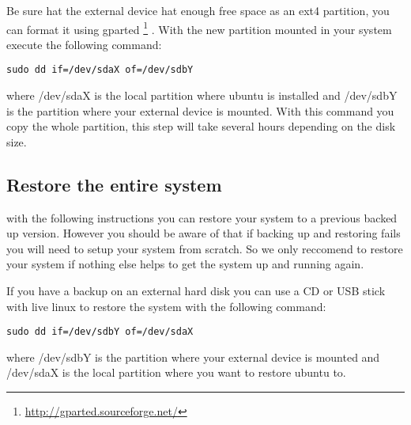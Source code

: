 Be sure hat the external device hat enough free space as an ext4 partition, you can format it using gparted \footnote{\url{http://gparted.sourceforge.net/}} . With the new partition mounted in your system execute the following command:
\begin{lstlisting}
sudo dd if=/dev/sdaX of=/dev/sdbY
\end{lstlisting}
where /dev/sdaX is the local partition where ubuntu is installed and /dev/sdbY is the partition where your external device is mounted. With this command you copy the whole partition, this step will take several hours depending on the disk size.

\subsection{Restore the entire system}
with the following instructions you can restore your system to a previous backed up version. However you should be aware of that if backing up and restoring fails you will need to setup your system from scratch. So we only reccomend to restore your system if nothing else helps to get the system up and running again. 

If you have a backup on an external hard disk you can use a CD or USB stick with live linux to restore the system with the following command:
\begin{lstlisting}
sudo dd if=/dev/sdbY of=/dev/sdaX
\end{lstlisting}
where /dev/sdbY is the partition where your external device is mounted and /dev/sdaX is the local partition where you want to restore ubuntu to.


